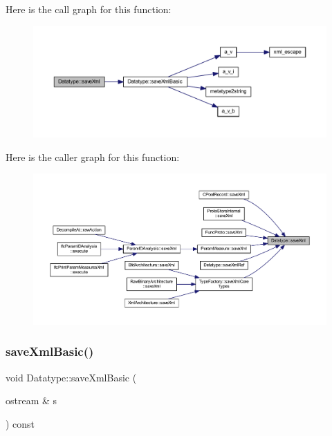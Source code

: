 Here is the call graph for this function\+:
\nopagebreak
\begin{figure}[H]
\begin{center}
\leavevmode
\includegraphics[width=350pt]{class_datatype_a33339824f1c50d4354952296070c3902_cgraph}
\end{center}
\end{figure}
Here is the caller graph for this function\+:
\nopagebreak
\begin{figure}[H]
\begin{center}
\leavevmode
\includegraphics[width=350pt]{class_datatype_a33339824f1c50d4354952296070c3902_icgraph}
\end{center}
\end{figure}
\mbox{\label{class_datatype_a27dc7495a59adaca34b83366a963fd45}} 
\subsubsection{\texorpdfstring{saveXmlBasic()}{saveXmlBasic()}}
{\footnotesize\ttfamily void Datatype\+::save\+Xml\+Basic (\begin{DoxyParamCaption}\item[{ostream \&}]{s }\end{DoxyParamCaption}) const}



